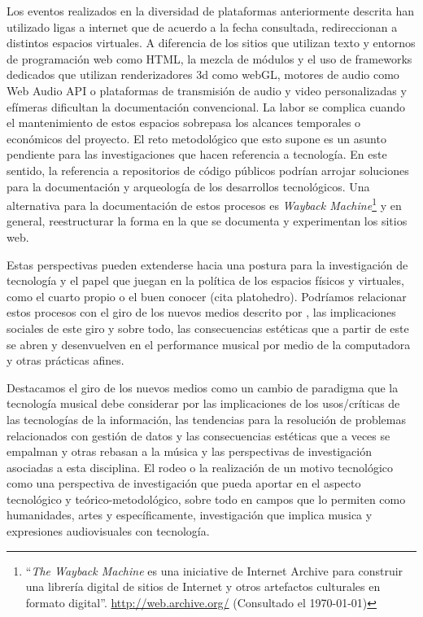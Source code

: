 Los eventos realizados en la diversidad de plataformas anteriormente descrita han utilizado ligas a internet que de acuerdo a la fecha consultada, redireccionan a distintos espacios virtuales. A diferencia de los sitios que utilizan texto y entornos de programación web como HTML, la mezcla de módulos y el uso de frameworks dedicados que utilizan renderizadores 3d como webGL, motores de audio como Web Audio API o plataformas de transmisión de audio y video personalizadas y efímeras dificultan la documentación convencional. La labor se complica cuando el mantenimiento de estos espacios sobrepasa los alcances temporales o económicos del proyecto. El reto metodológico que esto supone es un asunto pendiente para las investigaciones que hacen referencia a tecnología. En este sentido, la referencia a repositorios de código públicos podrían arrojar soluciones para la documentación y arqueología de los desarrollos tecnológicos. Una alternativa para la documentación de estos procesos es \textit{Wayback Machine}\footnote{``\textit{The Wayback Machine} es una iniciative de Internet Archive para construir una librería digital de sitios de Internet y otros artefactos culturales en formato digital''. \url{http://web.archive.org/} (Consultado el \today)} y en general, reestructurar la forma en la que se documenta y experimentan los sitios web. 

\color{black}

Estas perspectivas pueden extenderse hacia una postura para la investigación de tecnología y el papel que juegan en la política de los espacios físicos y virtuales, como el cuarto propio \citep{cuartopropio} o el buen conocer (cita platohedro). Podríamos relacionar estos procesos con el giro de los nuevos medios descrito por \cite{manovichlanguage}, las implicaciones sociales de este giro y sobre todo, las consecuencias estéticas que a partir de este se abren y desenvuelven en el performance musical por medio de la computadora y otras prácticas afines. 

Destacamos el giro de los nuevos medios como un cambio de paradigma que la tecnología musical debe considerar por las implicaciones de los usos/críticas de las tecnologías de la información, las tendencias para la resolución de problemas relacionados con gestión de datos y las consecuencias estéticas que a veces se empalman y otras rebasan a la música y las perspectivas de investigación asociadas a esta disciplina. El rodeo o la realización de un motivo tecnológico como una perspectiva de investigación que pueda aportar en el aspecto tecnológico y teórico-metodológico, sobre todo en campos que lo permiten como humanidades, artes y específicamente, investigación que implica musica y expresiones audiovisuales con tecnología.


